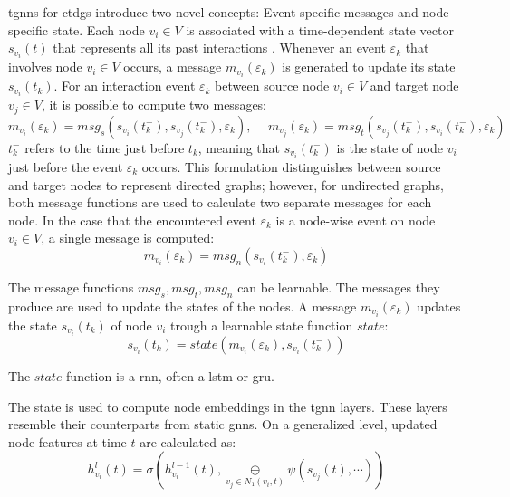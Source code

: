 \glspl{tgnn} for \glspl{ctdg} introduce two novel concepts: 
Event-specific messages and node-specific state. 
Each node $v_i \in V$ is associated with a time-dependent state vector $s_{v_i}(t)$ that represents all its past interactions \cite{longa_graph_2023}. Whenever an event $\varepsilon_{k}$ that involves node $v_i \in V$ occurs, a message $m_{v_i}(\varepsilon_{k})$ is generated to update its state $s_{v_i}(t_k)$. For an interaction event $\varepsilon_{k}$ between source node $v_i \in V$ and target node $v_j \in V$, it is possible to compute two messages:
\begin{equation}
    m_{v_i}(\varepsilon_{k}) = msg_s(s_{v_i}(t_k^-), s_{v_j}(t_k^-), \varepsilon_{k}), \hspace{15pt} m_{v_j}(\varepsilon_{k}) = msg_t(s_{v_j}(t_k^-), s_{v_i}(t_k^-), \varepsilon_{k})
\end{equation}
$t_k^-$ refers to the time just before $t_k$, meaning that $s_{v_i}(t_k^-)$ is the state of node $v_i$ just before the event $\varepsilon_{k}$ occurs. This formulation distinguishes between source and target nodes to represent directed graphs; however, for undirected graphs, both message functions are used to calculate two separate messages for each node. In the case that the encountered event $\varepsilon_{k}$ is a node-wise event on node $v_i \in V$, a single message is computed:
\begin{equation}
    m_{v_i}(\varepsilon_{k}) = msg_n(s_{v_i}(t_k^-), \varepsilon_{k})
\end{equation}

The message functions $msg_s, msg_t, msg_n$ can be learnable. The messages they produce are used to update the states of the nodes. A message $m_{v_i}(\varepsilon_{k})$ updates the state $s_{v_i}(t_k)$ of node $v_i$ trough a learnable state function $state$:
\begin{equation}
    s_{v_i}(t_k) = state(m_{v_i}(\varepsilon_{k}), s_{v_i}(t_k^-))
\end{equation}

The $state$ function is a \gls{rnn}, often a \gls{lstm} or \gls{gru}.

The state is used to compute node embeddings in the \gls{tgnn} layers. These layers resemble their counterparts from static \glspl{gnn}. On a generalized level, updated node features at time $t$ are calculated as:
\begin{equation}
    h_{v_i}^l(t) = \sigma(h_{v_i}^{l-1}(t), \underset{v_j \in N_1(v_i, t)}{\oplus} \psi(s_{v_j}(t), \cdots))
\end{equation}

